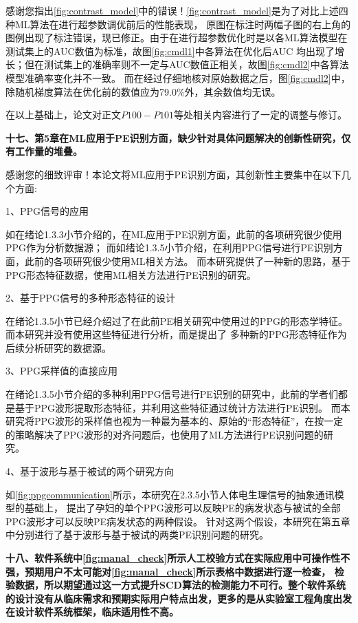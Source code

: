感谢您指出\autoref{fig:contrast_model}中的错误！\autoref{fig:contrast_model}是为了对比上述四种ML算法在进行超参数调优前后的性能表现，
原图在标注时两幅子图的右上角的图例出现了标注错误，现已修正。由于在进行超参数优化时是以各ML算法模型在测试集上的AUC数值为标准，故图\autoref{fig:cmdl1}中各算法在优化后AUC
均出现了增长；但在测试集上的准确率则不一定与AUC数值正相关，故图\autoref{fig:cmdl2}中各算法模型准确率变化并不一致。
而在经过仔细地核对原始数据之后，图\autoref{fig:cmdl2}中，除随机梯度算法在优化前的数值应为79.0\%外，其余数值均无误。

在以上基础上，论文对正文$P100-P101$等处相关内容进行了一定的调整与修订。

\textbf{十七、第5章在ML应用于PE识别方面，缺少针对具体问题解决的创新性研究，仅有工作量的堆叠。}

感谢您的细致评审！本论文将ML应用于PE识别方面，其创新性主要集中在以下几个方面:

1、PPG信号的应用

如在绪论1.3.3小节介绍的，在ML应用于PE识别方面，此前的各项研究很少使用PPG作为分析数据源；
而如绪论1.3.5小节介绍，在利用PPG信号进行PE识别方面，此前的各项研究很少使用ML相关方法。
而本研究提供了一种新的思路，基于PPG形态特征数据，使用ML相关方法进行PE识别的研究。

2、基于PPG信号的多种形态特征的设计

在绪论1.3.5小节已经介绍过了在此前PE相关研究中使用过的PPG的形态学特征。而本研究并没有使用这些特征进行分析，而是提出了
多种新的PPG形态特征作为后续分析研究的数据源。

3、PPG采样值的直接应用

在绪论1.3.5小节介绍的多种利用PPG信号进行PE识别的研究中，此前的学者们都是基于PPG波形提取形态特征，并利用这些特征通过统计方法进行PE识别。
而本研究将PPG波形的采样值也视为一种最为基本的、原始的“形态特征”，在按一定的策略解决了PPG波形的对齐问题后，也使用了ML方法进行PE识别问题的研究。

4、基于波形与基于被试的两个研究方向

如\autoref{fig:ppgcommunication}所示，本研究在2.3.5小节人体电生理信号的抽象通讯模型的基础上，
提出了孕妇的单个PPG波形可以反映PE的病发状态与被试的全部PPG波形才可以反映PE病发状态的两种假设。
针对这两个假设，本研究在第五章中分别进行了基于波形与基于被试的两类PE识别问题的研究。

\textbf{十八、软件系统中\autoref{fig:manal_check}所示人工校验方式在实际应用中可操作性不强，预期用户不太可能对\autoref{fig:manal_check}所示表格中数据进行逐一检查，
检验数据，所以期望通过这一方式提升SCD算法的检测能力不可行。整个软件系统的设计没有从临床需求和预期实际用户特点出发，更多的是从实验室工程角度出发在设计软件系统框架，临床适用性不高。}

